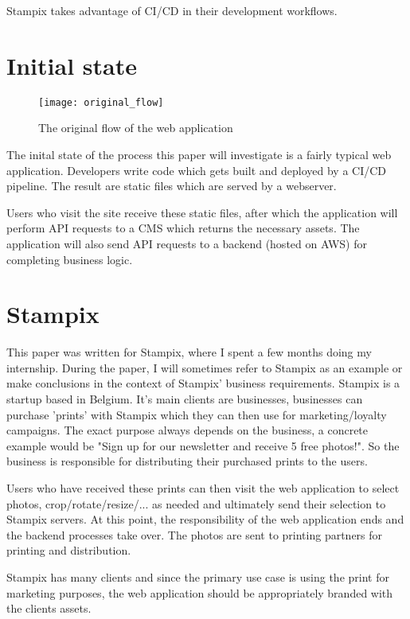 Stampix takes advantage of CI/CD in their development workflows.

\section{Initial state}

\begin{figure}[h!]
	\texttt{[image: original\_flow]}
	\caption{The original flow of the web application}
	\label{fig:original_flow}
\end{figure}


The inital state of the process this paper will investigate is a fairly typical web application. Developers write code which gets built and deployed by a CI/CD pipeline. The result are static files which are served by a webserver.

Users who visit the site receive these static files, after which the application will perform API requests to a CMS which returns the necessary assets. The application will also send API requests to a backend (hosted on AWS) for completing business logic.


\section{Stampix}

This paper was written for Stampix, where I spent a few months doing my internship. During the paper, I will sometimes refer to Stampix as an example or make conclusions in the context of Stampix' business requirements.
Stampix is a startup based in Belgium. It's main clients are businesses, businesses can purchase 'prints' with Stampix which they can then use for marketing/loyalty campaigns. 
The exact purpose always depends on the business, a concrete example would be "Sign up for our newsletter and receive 5 free photos!". So the business is responsible for distributing their purchased prints to the users.

Users who have received these prints can then visit the web application to select photos, crop/rotate/resize/... as needed and ultimately send their selection to Stampix servers. 
At this point, the responsibility of the web application ends and the backend processes take over. The photos are sent to printing partners for printing and distribution.

Stampix has many clients and since the primary use case is using the print for marketing purposes, the web application should be appropriately branded with the clients assets.
